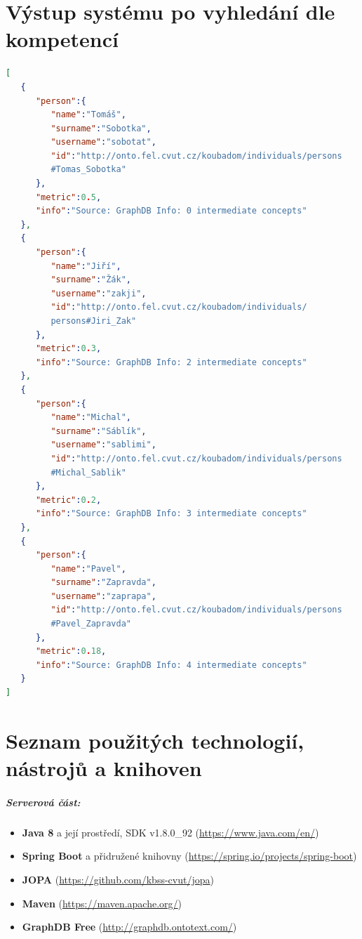 \chapter{Výstup systému po vyhledání dle kompetencí} \label{app:search-result}
\begin{lstlisting}[language=JSON, caption= Výstup systému při dotazu na vyhledání dle kompetencí, captionpos=b]
   [
   {
      "person":{
         "name":"Tomáš",
         "surname":"Sobotka",
         "username":"sobotat",
         "id":"http://onto.fel.cvut.cz/koubadom/individuals/persons
         #Tomas_Sobotka"
      },
      "metric":0.5,
      "info":"Source: GraphDB Info: 0 intermediate concepts"
   },
   {
      "person":{
         "name":"Jiří",
         "surname":"Žák",
         "username":"zakji",
         "id":"http://onto.fel.cvut.cz/koubadom/individuals/
         persons#Jiri_Zak"
      },
      "metric":0.3,
      "info":"Source: GraphDB Info: 2 intermediate concepts"
   },
   {
      "person":{
         "name":"Michal",
         "surname":"Sáblík",
         "username":"sablimi",
         "id":"http://onto.fel.cvut.cz/koubadom/individuals/persons
         #Michal_Sablik"
      },
      "metric":0.2,
      "info":"Source: GraphDB Info: 3 intermediate concepts"
   },
   {
      "person":{
         "name":"Pavel",
         "surname":"Zapravda",
         "username":"zaprapa",
         "id":"http://onto.fel.cvut.cz/koubadom/individuals/persons
         #Pavel_Zapravda"
      },
      "metric":0.18,
      "info":"Source: GraphDB Info: 4 intermediate concepts"
   }
]
\end{lstlisting}


\chapter{Seznam použitých technologií, nástrojů a knihoven} \label{app:technology-list}
\paragraph{Serverová část:}
\begin{itemize}
    \item \textbf{Java 8} a její prostředí, SDK v1.8.0\_92 (\url{https://www.java.com/en/})
    \item \textbf{Spring Boot} a přidružené knihovny (\url{https://spring.io/projects/spring-boot})
    \item \textbf{JOPA} (\url{https://github.com/kbss-cvut/jopa})
    \item \textbf{Maven} (\url{https://maven.apache.org/})
    \item \textbf{GraphDB Free} (\url{http://graphdb.ontotext.com/})
\end{itemize}
